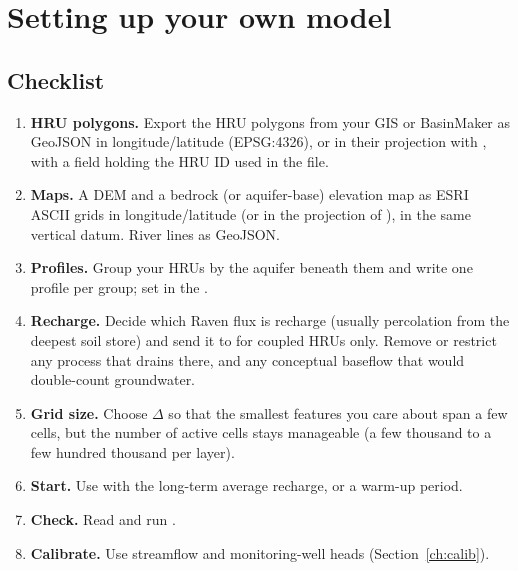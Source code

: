 \section{Setting up your own model}\label{ch:ownmodel}
\subsection{Checklist}
\begin{enumerate}
\item \textbf{HRU polygons.} Export the HRU polygons from your GIS or BasinMaker as GeoJSON in longitude/latitude
(EPSG:4326), or in their projection with , with a field holding the HRU ID used in the  file.
\item \textbf{Maps.} A DEM and a bedrock (or aquifer-base) elevation map as ESRI ASCII grids in longitude/latitude (or in the
projection of ), in the same vertical datum. River lines as GeoJSON.
\item \textbf{Profiles.} Group your HRUs by the aquifer beneath them and write one profile per group; set
 in the .
\item \textbf{Recharge.} Decide which Raven flux is recharge (usually percolation from the deepest soil store) and send it
to  for coupled HRUs only. Remove or restrict any process that drains  there, and any
conceptual baseflow that would double-count groundwater.
\item \textbf{Grid size.} Choose $\Delta$ so that the smallest features you care about span a few cells, but the number of
active cells stays manageable (a few thousand to a few hundred thousand per layer).
\item \textbf{Start.} Use  with the long-term average recharge, or a warm-up period.
\item \textbf{Check.} Read  and run .
\item \textbf{Calibrate.} Use streamflow and monitoring-well heads (Section~\ref{ch:calib}).
\end{enumerate}

